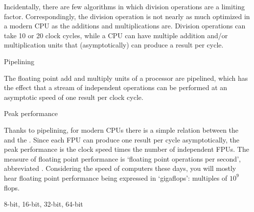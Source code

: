 Incidentally, there are few algorithms in which division operations
are a limiting factor. Correspondingly, the division operation is not
nearly as much optimized in a modern \ac{CPU} as the additions and
multiplications are. Division operations can take 10 or 20 clock
cycles, while a \ac{CPU} can have multiple addition and/or multiplication
units that (asymptotically) can produce a result per cycle.


 {Pipelining}
\label{sec:pipeline}

The floating point add and multiply units of a processor are
pipelined, which has the effect that a stream of independent
operations can be performed at an asymptotic speed of one result per
clock cycle.




 {Peak performance}

Thanks to pipelining, for modern \acp{CPU} there is a simple relation
between the  and the .
Since each \ac{FPU} can produce one result per cycle
asymptotically, the peak performance is the clock speed times the
number of independent \acp{FPU}. The measure of floating
point performance is `floating point operations per second',
abbreviated . Considering the speed of computers
these days, you will mostly hear floating point performance being
expressed in `gigaflops': multiples of $10^9$ flops.

 {8-bit, 16-bit, 32-bit, 64-bit}

